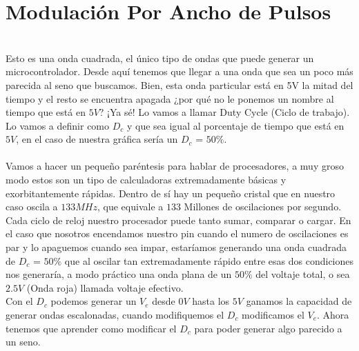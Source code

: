 \documentclass[]{article}
\begin{document}
\section*{Modulación Por Ancho de Pulsos}
\\
Esto es una onda cuadrada, el único tipo de ondas que puede generar un microcontrolador. Desde aquí tenemos que llegar a una onda que sea un poco más parecida al seno que buscamos. Bien, esta onda particular está en 5V la mitad del tiempo y el resto se encuentra apagada ¿por qué no le ponemos un nombre al tiempo que está en $5V$? ¡Ya sé! Lo vamos a llamar Duty Cycle (Ciclo de trabajo). Lo vamos a definir como $D_{c}$ y que sea igual al porcentaje de tiempo que está en $5V$, en el caso de nuestra gráfica sería un $D_{c}$ = $50\%$.\\\\
Vamos a hacer un pequeño paréntesis para hablar de procesadores, a muy groso modo estos son un tipo de calculadoras extremadamente básicas y exorbitantemente rápidas. Dentro de sí hay un pequeño cristal que en nuestro caso oscila a $133 MHz$, que equivale a $133$ Millones de oscilaciones por segundo. Cada ciclo de reloj nuestro procesador puede tanto sumar, comparar o cargar. En el caso que nosotros encendamos nuestro pin cuando el numero de oscilaciones es par y lo apaguemos cuando sea impar, estaríamos generando una onda cuadrada de $D_c$ = $50\%$ que al oscilar tan extremadamente rápido entre esas dos condiciones nos generaría, a modo práctico una onda plana de un $50\%$ del voltaje total, o sea $2.5V$ (Onda roja) llamada voltaje efectivo.\\
Con el $D_c$ podemos generar un $V_e$ desde $0V$ hasta los $5V$ ganamos la capacidad de generar ondas escalonadas, cuando modifiquemos el $D_c$ modificamos el $V_e$. Ahora tenemos que aprender como modificar el $D_c$ para poder generar algo parecido a un seno.
\end{document}
